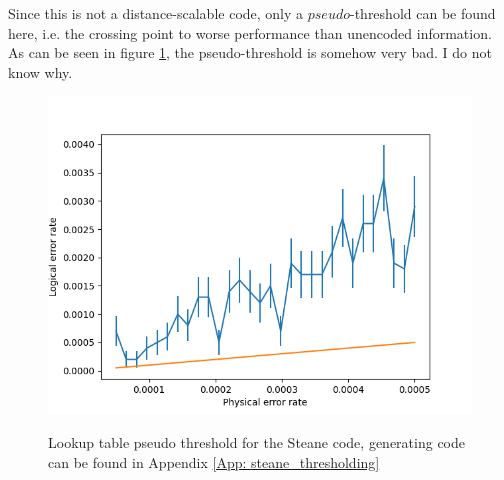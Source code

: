Since this is not a distance-scalable code, only a $pseudo$-threshold can
be found here, i.e. the crossing point to worse performance than unencoded
information. As can be seen in figure \ref{fig: steane_threshold}, the
pseudo-threshold is somehow very bad. I do not know why.

\begin{figure}[h!]
	\begin{center}
	\captionsetup{justification=centering,margin=2cm}
	\includegraphics[scale=0.7]{./img/figures/thresholds/steaneLookupThreshold.png}\\
	\caption{Lookup table pseudo threshold for the Steane code, generating code can be found in Appendix
    \ref{App: steane_thresholding}}
        
	\label{fig: steane_threshold}
	\end{center}
\end{figure}
\newpage